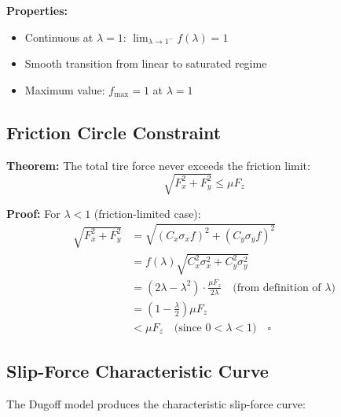 \documentclass[11pt,a4paper]{article}
\begin{document}
\textbf{Properties:}
\begin{itemize}
    \item Continuous at $\lambda = 1$: $\lim_{\lambda \to 1^-} f(\lambda) = 1$
    \item Smooth transition from linear to saturated regime
    \item Maximum value: $f_{\max} = 1$ at $\lambda = 1$
\end{itemize}

\subsection{Friction Circle Constraint}

\textbf{Theorem:} The total tire force never exceeds the friction limit:
\begin{equation}
\sqrt{F_x^2 + F_y^2} \leq \mu F_z
\end{equation}

\textbf{Proof:} For $\lambda < 1$ (friction-limited case):
\begin{align}
\sqrt{F_x^2 + F_y^2} &= \sqrt{(C_x \sigma_x f)^2 + (C_y \sigma_y f)^2} \\
&= f(\lambda) \sqrt{C_x^2 \sigma_x^2 + C_y^2 \sigma_y^2} \\
&= (2\lambda - \lambda^2) \cdot \frac{\mu F_z}{2\lambda} \quad \text{(from definition of $\lambda$)} \\
&= \left(1 - \frac{\lambda}{2}\right) \mu F_z \\
&< \mu F_z \quad \text{(since } 0 < \lambda < 1\text{)} \quad \square
\end{align}

\subsection{Slip-Force Characteristic Curve}

The Dugoff model produces the characteristic slip-force curve:
\end{document}
